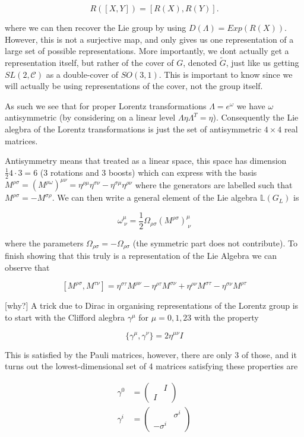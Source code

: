 \documentclass{article}
\theoremstyle{definition}
\begin{document}
$$ R([X, Y]) = [R(X), R(Y)]. $$

where we can then recover the Lie group by using $D(\Lambda) = Exp(R(X))$.
However, this is not a surjective map, and only gives us one representation of a
large set of possible representations. More importantly, we dont actually get a
representation itself, but rather of the cover of $G$, denoted $\tilde{G}$, just
like us getting $SL(2, \mathcal{C})$ as a double-cover of $SO(3, 1)$. This is
important to know since we will actually be using representations of the cover,
not the group itself.

As such we see that for proper Lorentz transformations $\Lambda = e^\omega$ we
have $\omega$ antisymmetric (by considering on a linear level $\Lambda \eta
\Lambda^T = \eta$). Consequently the Lie alegbra of the Lorentz transformations
is just the set of antisymmetric $4\times 4$ real matrices.

Antisymmetry means that treated as a linear space, this space has dimension
$\frac{1}{2} 4 \cdot 3 = 6$ (3 rotations and 3 boosts) which can express with
the basis $M^{\rho \sigma} = (M^{\rho \omega})^{\mu \nu} = \eta^{\rho \mu}
\eta^{\sigma \nu} - \eta^{\sigma \mu} \eta^{\rho \nu}$ where the generators are
labelled such that $M^{\rho \sigma} = -M^{\sigma \rho}$. We can then write a
general element of the Lie algebra $\mathbb{L}(G_L)$ is

$$ \omega^\mu_{\ \nu} = \frac{1}{2} \Omega_{\rho \sigma} (M^{\rho
  \sigma})^\mu_{\ \nu} $$

where the parameters $\Omega_{\rho \sigma} = -\Omega_{\rho \sigma}$ (the
symmetric part does not contribute). To finish showing that this truly is a
representation of the Lie Algebra we can observe that

$$ [M^{\rho \sigma}, M^{\tau \nu}] = \eta^{\sigma \tau} M^{\rho \nu} -
\eta^{\rho \tau} M^{\sigma \nu} + \eta^{\rho \nu} M^{\sigma \tau} - \eta^{\sigma
\nu} M^{\rho \tau} $$

[why?] A trick due to Dirac in organising representations of the Lorentz group is to
start with the Clifford alegbra $\gamma^\mu$ for $\mu = 0, 1,2 3$ with the
property

$$ \{ \gamma^\mu, \gamma^\nu \} = 2 \eta^{\mu \nu} I $$

This is satisfied by the Pauli matrices, however, there are only 3 of those, and
it turns out the lowest-dimensional set of 4 matrices satisfying these
properties are

\begin{align*}
\gamma^0 &= 
\begin{pmatrix}
& I \\
I & 
\end{pmatrix} \\
\gamma^i &=
\begin{pmatrix}
& \sigma^i \\
-\sigma^i & 
\end{pmatrix}
\end{align*}
\end{document}
